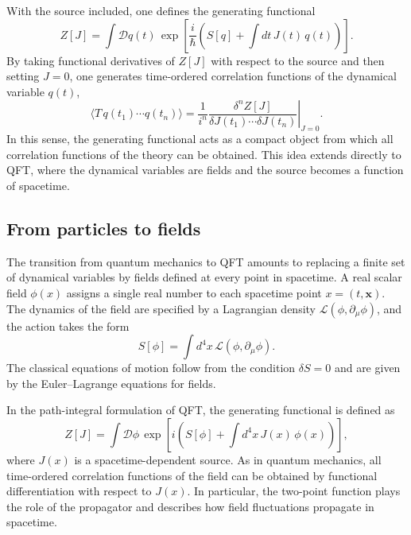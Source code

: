 With the source included, one defines the generating functional
\begin{equation}
Z[J] = \int \mathcal{D}q(t)\,
\exp\!\left[\frac{i}{\hbar}
\left(S[q] + \int dt\, J(t)\, q(t)\right)\right].
\end{equation}
By taking functional derivatives of $Z[J]$ with respect to the source and then
setting $J=0$, one generates time-ordered correlation functions of the dynamical
variable $q(t)$,
\begin{equation}
\langle T\, q(t_1)\cdots q(t_n)\rangle
= \left. \frac{1}{i^n}
\frac{\delta^n Z[J]}{\delta J(t_1)\cdots \delta J(t_n)}
\right|_{J=0}.
\end{equation}
In this sense, the generating functional acts as a compact object from which all
correlation functions of the theory can be obtained. This idea extends directly
to QFT, where the dynamical variables are fields and the source
becomes a function of spacetime.


\subsection*{From particles to fields}

The transition from quantum mechanics to QFT amounts to
replacing a finite set of dynamical variables by fields defined at every point
in spacetime. A real scalar field $\phi(x)$ assigns a single real number to each
spacetime point $x=(t,\mathbf{x})$. The dynamics of the field are specified by
a Lagrangian density $\mathcal{L}(\phi,\partial_\mu\phi)$, and the action takes
the form
\begin{equation}
S[\phi] = \int d^4x \, \mathcal{L}(\phi,\partial_\mu\phi).
\end{equation}
The classical equations of motion follow from the condition $\delta S=0$ and are
given by the Euler–Lagrange equations for fields.

In the path-integral formulation of QFT, the generating
functional is defined as
\begin{equation}
Z[J] = \int \mathcal{D}\phi \,
\exp\!\left[i\left(S[\phi] + \int d^4x\, J(x)\,\phi(x)\right)\right],
\end{equation}
where $J(x)$ is a spacetime-dependent source. As in quantum mechanics, all
time-ordered correlation functions of the field can be obtained by functional
differentiation with respect to $J(x)$. In particular, the two-point function
plays the role of the propagator and describes how field fluctuations propagate
in spacetime.

